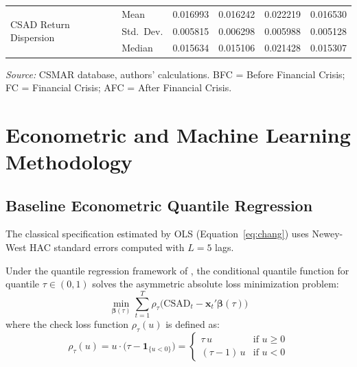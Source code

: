 \documentclass[12pt, a4paper]{article}
\begin{document}
\begin{table}[H]
\begin{threeparttable}
\begin{tabular}{llcccc}
    \multirow{3}{*}{CSAD Return Dispersion}
      & Mean      & 0.016993 & 0.016242 & 0.022219 & 0.016530 \\
      & Std.\ Dev.& 0.005815 & 0.006298 & 0.005988 & 0.005128 \\
      & Median    & 0.015634 & 0.015106 & 0.021428 & 0.015307 \\
    \bottomrule
  \end{tabular}
  \begin{tablenotes}
    \footnotesize
    \item \textit{Source:} CSMAR database, authors' calculations. BFC = Before Financial Crisis; FC = Financial Crisis; AFC = After Financial Crisis.
  \end{tablenotes}
  \end{threeparttable}
\end{table}

\section{Econometric and Machine Learning Methodology}

\subsection{Baseline Econometric Quantile Regression}

The classical \citet{Chang2000} specification estimated by OLS (Equation~\ref{eq:chang}) uses Newey-West HAC standard errors computed with $L=5$ lags.

Under the quantile regression framework of \citet{Koenker1978}, the conditional quantile function for quantile $\tau \in (0,1)$ solves the asymmetric absolute loss minimization problem:
\begin{equation}
  \min_{\boldsymbol{\beta}(\tau)} \sum_{t=1}^T \rho_\tau \bigl(\mathrm{CSAD}_t - \mathbf{x}_t' \boldsymbol{\beta}(\tau)\bigr)
\end{equation}
where the check loss function $\rho_\tau(u)$ is defined as:
\begin{equation}
  \rho_\tau(u) = u \cdot \bigl(\tau - \mathbf{1}_{\{u < 0\}}\bigr)
  = \begin{cases} \tau\, u & \text{if } u \ge 0 \\ (\tau-1)\, u & \text{if } u < 0 \end{cases}
\end{equation}
\end{document}
